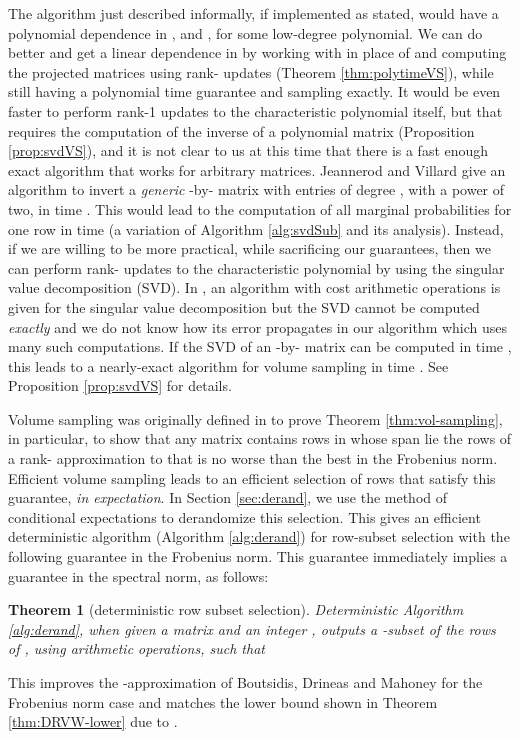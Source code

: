 \documentclass[11pt]{article}
\newtheorem{theorem}{Theorem}
\begin{document}
The algorithm just described informally, if implemented as stated, would have a polynomial dependence in ,  and , for some low-degree polynomial. We can do better and get a linear dependence in  by working with  in place of  and computing the projected matrices using rank- updates (Theorem \ref{thm:polytimeVS}), while still having a polynomial time guarantee and sampling exactly. It would be even faster to perform rank-1 updates to the characteristic polynomial itself, but that requires the computation of the inverse of a polynomial matrix (Proposition \ref{prop:svdVS}), and it is not clear to us at this time that there is a fast enough exact algorithm that works for arbitrary matrices. Jeannerod and Villard \cite{JV} give an algorithm to invert a \emph{generic} -by- matrix with entries of degree , with  a power of two, in time . This would lead to the computation of all marginal probabilities for one row in time  (a variation of Algorithm \ref{alg:svdSub} and its analysis). 
Instead, if we are willing to be more practical, while sacrificing our guarantees, then we can perform rank- updates to the characteristic polynomial by using the singular value decomposition (SVD). In \cite{GVL}, an algorithm with cost  arithmetic operations is given for the singular value decomposition but the SVD cannot be computed \emph{exactly} and we do not know how its error propagates in our algorithm which uses many such computations. If the SVD of an -by- matrix can be computed in time , this leads to a nearly-exact algorithm for volume sampling in time . See Proposition \ref{prop:svdVS} for details.

Volume sampling was originally defined in \cite{DRVW} to prove Theorem \ref{thm:vol-sampling}, in particular, to show that any matrix  contains  rows in whose span lie the rows of a rank- approximation to  that is no worse than the best in the Frobenius norm. Efficient volume sampling leads to an efficient selection of  rows that satisfy this guarantee, \emph{in expectation}. In Section \ref{sec:derand}, we use the method of conditional expectations to derandomize this selection. This gives an efficient deterministic algorithm (Algorithm \ref{alg:derand}) for row-subset selection with the following guarantee in the Frobenius norm. This guarantee immediately implies a guarantee in the spectral norm, as follows:

\begin{theorem}[deterministic row subset selection] \label{thm:det-sub-select}
Deterministic Algorithm \ref{alg:derand}, when given a matrix  and an integer , outputs a -subset  of the rows of , using  arithmetic operations, such that

\end{theorem}
This improves the -approximation of Boutsidis, Drineas and Mahoney \cite{BDM} for the Frobenius norm case and matches the lower bound shown in Theorem \ref{thm:DRVW-lower} due to \cite{DRVW}.
\end{document}
